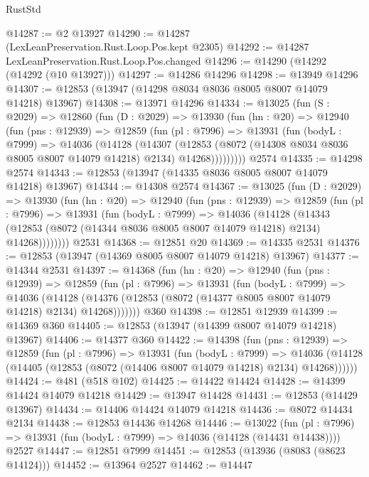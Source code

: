 \begin{lexlean}{RustStd}
\begin{coremodule}
@14287 := @2 @13927
@14290 := @14287 (LexLeanPreservation.Rust.Loop.Pos.kept @2305)
@14292 := @14287 LexLeanPreservation.Rust.Loop.Pos.changed
@14296 := @14290 (@14292 (@14292 (@10 @13927)))
@14297 := @14286 @14296
@14298 := @13949 @14296
@14307 := @12853 (@13947 (@14298 @8034 @8036 @8005 @8007 @14079 @14218) @13967)
@14308 := @13971 @14296
@14334 := @13025
    (fun (S : @2029) =>
    @12860
      (fun (D : @2029) =>
      @13930
        (fun (hn : @20) =>
        @12940
          (fun (pns : @12939) =>
          @12859
            (fun (pl : @7996) =>
            @13931
              (fun (bodyL : @7999) =>
              @14036
                (@14128
                  (@14307
                    (@12853
                      (@8072 (@14308 @8034 @8036 @8005 @8007 @14079 @14218) @2134)
                      @14268)))))))))
    @2574
@14335 := @14298 @2574
@14343 := @12853 (@13947 (@14335 @8036 @8005 @8007 @14079 @14218) @13967)
@14344 := @14308 @2574
@14367 := @13025
    (fun (D : @2029) =>
    @13930
      (fun (hn : @20) =>
      @12940
        (fun (pns : @12939) =>
        @12859
          (fun (pl : @7996) =>
          @13931
            (fun (bodyL : @7999) =>
            @14036
              (@14128
                (@14343
                  (@12853 (@8072 (@14344 @8036 @8005 @8007 @14079 @14218) @2134) @14268))))))))
    @2531
@14368 := @12851 @20
@14369 := @14335 @2531
@14376 := @12853 (@13947 (@14369 @8005 @8007 @14079 @14218) @13967)
@14377 := @14344 @2531
@14397 := @14368
    (fun (hn : @20) =>
    @12940
      (fun (pns : @12939) =>
      @12859
        (fun (pl : @7996) =>
        @13931
          (fun (bodyL : @7999) =>
          @14036
            (@14128 (@14376 (@12853 (@8072 (@14377 @8005 @8007 @14079 @14218) @2134) @14268)))))))
    @360
@14398 := @12851 @12939
@14399 := @14369 @360
@14405 := @12853 (@13947 (@14399 @8007 @14079 @14218) @13967)
@14406 := @14377 @360
@14422 := @14398
    (fun (pns : @12939) =>
    @12859
      (fun (pl : @7996) =>
      @13931
        (fun (bodyL : @7999) =>
        @14036 (@14128 (@14405 (@12853 (@8072 (@14406 @8007 @14079 @14218) @2134) @14268))))))
@14424 := @481 (@518 @102)
@14425 := @14422 @14424
@14428 := @14399 @14424 @14079 @14218
@14429 := @13947 @14428
@14431 := @12853 (@14429 @13967)
@14434 := @14406 @14424 @14079 @14218
@14436 := @8072 @14434 @2134
@14438 := @12853 @14436 @14268
@14446 := @13022
    (fun (pl : @7996) => @13931 (fun (bodyL : @7999) => @14036 (@14128 (@14431 @14438))))
    @2527
@14447 := @12851 @7999
@14451 := @12853 (@13936 (@8083 (@8623 @14124)))
@14452 := @13964 @2527
@14462 := @14447

\end{coremodule}
\end{lexlean}
